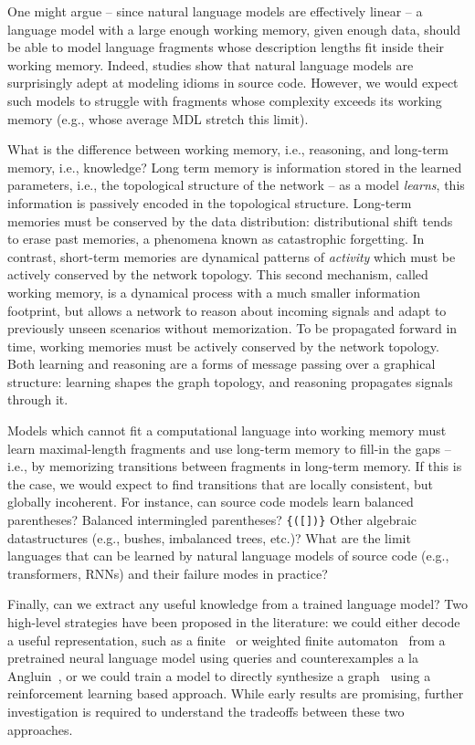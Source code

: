 \documentclass[12pt]{article}
\begin{document}
One might argue -- since natural language models are effectively linear -- a language model with a large enough working memory, given enough data, should be able to model language fragments whose description lengths fit inside their working memory. Indeed, studies show that natural language models are surprisingly adept at modeling idioms in source code. However, we would expect such models to struggle with fragments whose complexity exceeds its working memory (e.g., whose average MDL stretch this limit).

What is the difference between working memory, i.e., reasoning, and long-term memory, i.e., knowledge? Long term memory is information stored in the learned parameters, i.e., the topological structure of the network -- as a model \textit{learns}, this information is passively encoded in the topological structure. Long-term memories must be conserved by the data distribution: distributional shift tends to erase past memories, a phenomena known as catastrophic forgetting. In contrast, short-term memories are dynamical patterns of \textit{activity} which must be actively conserved by the network topology. This second mechanism, called working memory, is a dynamical process with a much smaller information footprint, but allows a network to reason about incoming signals and adapt to previously unseen scenarios without memorization. To be propagated forward in time, working memories must be actively conserved by the network topology. Both learning and reasoning are a forms of message passing over a graphical structure: learning shapes the graph topology, and reasoning propagates signals through it.

Models which cannot fit a computational language into working memory must learn maximal-length fragments and use long-term memory to fill-in the gaps -- i.e., by memorizing transitions between fragments in long-term memory. If this is the case, we would expect to find transitions that are locally consistent, but globally incoherent. For instance, can source code models learn balanced parentheses? Balanced intermingled parentheses? \texttt{\{([])\}} Other algebraic datastructures (e.g., bushes, imbalanced trees, etc.)? What are the limit languages that can be learned by natural language models of source code (e.g., transformers, RNNs) and their failure modes in practice?

Finally, can we extract any useful knowledge from a trained language model? Two high-level strategies have been proposed in the literature: we could either decode a useful representation, such as a finite~\cite{weiss2018extracting} or weighted finite automaton~\cite{weiss2019learning} from a pretrained neural language model using queries and counterexamples a la Angluin~\cite{angluin1987learning}, or we could train a model to directly synthesize a graph~\cite{johnson2020learning} using a reinforcement learning based approach. While early results are promising, further investigation is required to understand the tradeoffs between these two approaches.
\end{document}
